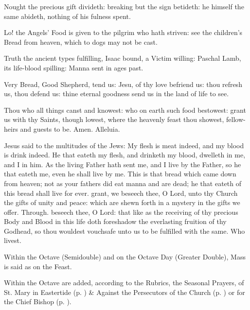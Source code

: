 \begin{multicols}{2}
Nought the precious gift divideth: breaking but the sign betideth: he himself the same abideth, nothing of his fulness spent.\par
Lo! the Angels' Food is given to the pilgrim who hath striven: see the children's Bread from heaven, which to dogs may not be cast.\par
Truth the ancient types fulfilling, Isaac bound, a Victim willing: Paschal Lamb, its life-blood spilling: Manna sent in ages past.\par
Very Bread, Good Shepherd, tend us: Jesu, of thy love befriend us: thou refresh us, thou defend us: thine eternal goodness send us in the land of life to see.\par
Thou who all things canst and knowest: who on earth such food bestowest: grant us with thy Saints, though lowest, where the heavenly feast thou showest, fellow-heirs and guests to be. Amen. Alleluia.
\end{multicols}


 Jesus said to the multitudes of the Jews: My flesh is meat indeed, and my blood is drink indeed. He that eateth my flesh, and drinketh my blood, dwelleth in me, and I in him. As the living Father hath sent me, and I live by the Father, so he that eateth me, even he shall live by me. This is that bread which came down from heaven; not as your fathers did eat manna and are dead; he that eateth of this bread shall live for ever.
\secret
{} grant, we beseech thee, O Lord, unto thy Church the gifts of unity and peace: which are shewn forth in a mystery in the gifts we offer. Through.
\postcommunion
{} beseech thee, O Lord: that like as the receiving of thy precious Body and Blood in this life doth foreshadow the everlasting fruition of thy Godhead, so thou wouldest vouchsafe unto us to be fulfilled with the same. Who livest.
\begin{rubric}
    Within the Octave (Semidouble) and on the Octave Day (Greater Double), Mass is said as on the Feast.
\end{rubric}
\begin{rubric}
    Within the Octave are added, according to the Rubrics, the Seasonal Prayers,  of St. Mary in Eastertide (p. \pageref{SPMaryInEaster}) \&  Against the Persecutors of the Church (p. \pageref{SPAgainst}) or for the Chief Bishop (p. \pageref{SPChiefBishop}).
\end{rubric}

